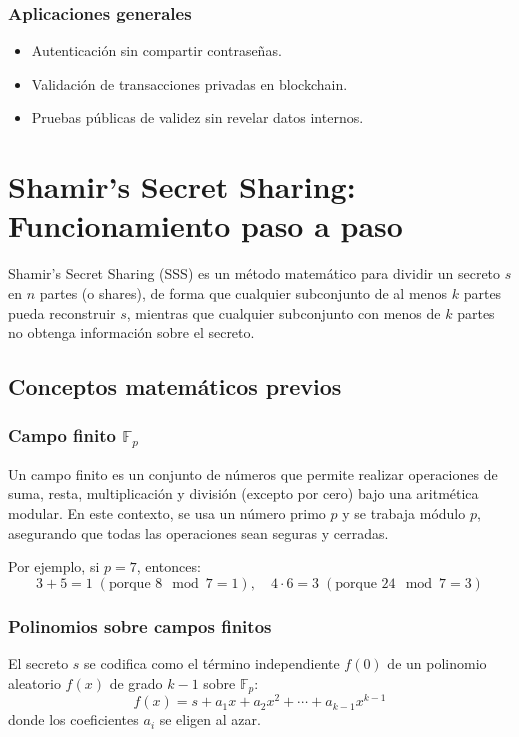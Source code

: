 \documentclass{article}
\begin{document}
\subsubsection{Aplicaciones generales}

\begin{itemize}
    \item Autenticación sin compartir contraseñas.
    \item Validación de transacciones privadas en blockchain.
    \item Pruebas públicas de validez sin revelar datos internos.
\end{itemize}


\section{Shamir’s Secret Sharing: Funcionamiento paso a paso}

Shamir’s Secret Sharing (SSS) es un método matemático para dividir un secreto \( s \) en \( n \) partes (o shares), de forma que cualquier subconjunto de al menos \( k \) partes pueda reconstruir \( s \), mientras que cualquier subconjunto con menos de \( k \) partes no obtenga información sobre el secreto.

\subsection{Conceptos matemáticos previos}

\subsubsection{Campo finito \( \mathbb{F}_p \)}
Un campo finito es un conjunto de números que permite realizar operaciones de suma, resta, multiplicación y división (excepto por cero) bajo una aritmética modular. En este contexto, se usa un número primo \( p \) y se trabaja módulo \( p \), asegurando que todas las operaciones sean seguras y cerradas.

Por ejemplo, si \( p = 7 \), entonces:
\[
3 + 5 = 1 \; (\text{porque } 8 \mod 7 = 1), \quad 4 \cdot 6 = 3 \; (\text{porque } 24 \mod 7 = 3)
\]

\subsubsection{Polinomios sobre campos finitos}
El secreto \( s \) se codifica como el término independiente \( f(0) \) de un polinomio aleatorio \( f(x) \) de grado \( k-1 \) sobre \( \mathbb{F}_p \):
\[
f(x) = s + a_1 x + a_2 x^2 + \cdots + a_{k-1} x^{k-1}
\]
donde los coeficientes \( a_i \) se eligen al azar.
\end{document}
